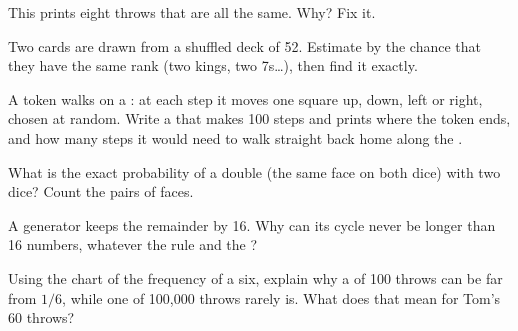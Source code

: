 \begin{exercise}[$\star\star$]\label{exo:g9:randomness-and-simulation:6}
This  prints eight throws that are all the same. Why? Fix it.

\label{lst:g9:randomness-and-simulation:seed-bug}
\end{exercise}

\begin{exercise}[$\star\star$]\label{exo:g9:randomness-and-simulation:7}
Two cards are drawn from a shuffled deck of 52. Estimate by  the chance
that they have the same rank (two kings, two 7s\ldots), then find it exactly.
\end{exercise}

\begin{exercise}[$\star\star$]\label{exo:g9:randomness-and-simulation:8}
A token walks on a : at each step it moves one square up, down, left or
right, chosen at random. Write a  that makes 100 steps and prints where
the token ends, and how many steps it would need to walk straight back home
along the .
\end{exercise}

\begin{exercise}[$\star\star$]\label{exo:g9:randomness-and-simulation:9}
What is the exact probability of a double (the same face on both dice) with two
dice? Count the pairs of faces.
\end{exercise}

\begin{exercise}[$\star\star\star$]\label{exo:g9:randomness-and-simulation:10}
A generator keeps the remainder by 16. Why can its cycle never be longer than 16
numbers, whatever the rule and the ?
\end{exercise}

\begin{exercise}[$\star\star\star$]\label{exo:g9:randomness-and-simulation:11}
Using the chart of the frequency of a six, explain why a  of 100 throws
can be far from $1/6$, while one of 100,000 throws rarely is. What does that mean
for Tom's 60 throws?
\end{exercise}

